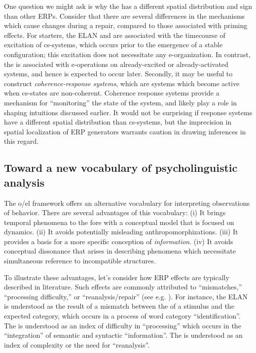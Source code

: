 One question we might ask is why the  has a different spatial distribution and sign than other ERPs. Consider that there are several differences in the mechanisms which cause  changes during a repair, compared to those associated with priming effects. For starters, the ELAN and  are associated with the timecourse of excitation of cs-systems, which occurs prior to the emergence of a stable configuration; this excitation does not necessitate any e-organization. In contrast, the  is associated with e-operations on already-excited or already-activated systems, and hence is expected to occur later. Secondly, it may be useful to construct \textit{coherence-response systems}, which are systems which become active when cs-states are non-coherent. Coherence response systems provide a mechanism for “monitoring” the state of the system, and likely play a role in shaping  intuitions discussed earlier. It would not be surprising if  response systems have a different spatial distribution than cs-systems, but the imprecision in spatial localization of ERP generators warrants caution in drawing inferences in this regard.

\subsection{Toward a new vocabulary of psycholinguistic analysis}

The o/el framework offers an alternative vocabulary for interpreting  observations of behavior. There are several advantages of this vocabulary: (i) It brings temporal phenomena to the fore with a conceptual model that is focused on dynamics. (ii) It avoids potentially misleading anthropomorphizations. (iii) It provides a basis for a more specific conception of \textit{information}. (iv) It avoids conceptual dissonance that arises in describing phenomena which necessitate simultaneous reference to incompatible structures.

To illustrate these advantages, let's consider how ERP effects are typically described in  literature. Such effects are commonly attributed to “mismatches,” “processing difficulty,” or “reanalysis/repair” (see e.g. \citealt{Friederici2002,KutasFedermeier2011}). For instance, the ELAN is understood as the result of a mismatch between the  of a stimulus and the expected category, which occurs in a process of word category “identification”. The  is understood as an index of difficulty in “processing” which occurs in the “integration” of semantic and syntactic “information”. The  is understood as an index of complexity or the need for “reanalysis”.

